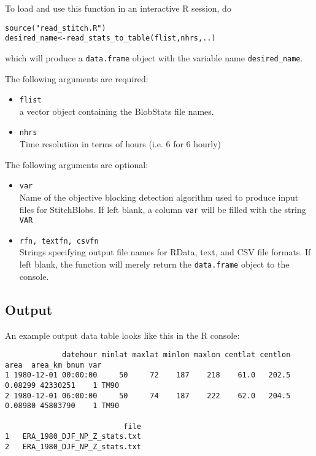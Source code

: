 \documentclass{article}
\begin{document}
To load and use  this function in an interactive R session, do
\begin{verbatim}
source("read_stitch.R")
desired_name<-read_stats_to_table(flist,nhrs,..)
\end{verbatim}

which will produce a \texttt{data.frame} object with the variable name \texttt{desired\_name}.

The following arguments are required:
\begin{itemize}
\item[] \texttt{flist}\\ a vector object containing the BlobStats file names.
\item[] \texttt{nhrs}\\ Time resolution in terms of hours (i.e. 6 for 6 hourly)
\end{itemize}

The following arguments are optional:
\begin{itemize}
\item[] \texttt{var}\\ Name of the objective blocking detection algorithm used to produce input files for StitchBlobs. If left blank, a column \texttt{var} will be filled with the string \texttt{VAR}
\item[] \texttt{rfn, textfn, csvfn}\\Strings specifying output file names for RData, text, and CSV file formats. If left blank, the function will merely return the \texttt{data.frame} object to the console.
\end{itemize}

\subsection{Output}\label{tableoutput}

An example output data table looks like this in the R console:
\begin{verbatim}
             datehour minlat maxlat minlon maxlon centlat centlon    area  area_km bnum var
1 1980-12-01 00:00:00     50     72    187    218    61.0   202.5 0.08299 42330251    1 TM90
2 1980-12-01 06:00:00     50     74    187    222    62.0   204.5 0.08980 45803790    1 TM90

                           file
1   ERA_1980_DJF_NP_Z_stats.txt
2   ERA_1980_DJF_NP_Z_stats.txt
\end{verbatim}
\end{document}
